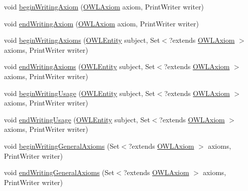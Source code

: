 \begin{DoxyCompactItemize}
\item 
void \hyperlink{classuk_1_1ac_1_1manchester_1_1cs_1_1owlapi_1_1dlsyntax_1_1_d_l_syntax_ontology_storer_base_ae46e9c3d6b3b31254873389ff08f0734}{begin\-Writing\-Axiom} (\hyperlink{interfaceorg_1_1semanticweb_1_1owlapi_1_1model_1_1_o_w_l_axiom}{O\-W\-L\-Axiom} axiom, Print\-Writer writer)
\item 
void \hyperlink{classuk_1_1ac_1_1manchester_1_1cs_1_1owlapi_1_1dlsyntax_1_1_d_l_syntax_ontology_storer_base_abe39b14e66986c88027bdbce7e67cc7f}{end\-Writing\-Axiom} (\hyperlink{interfaceorg_1_1semanticweb_1_1owlapi_1_1model_1_1_o_w_l_axiom}{O\-W\-L\-Axiom} axiom, Print\-Writer writer)
\item 
void \hyperlink{classuk_1_1ac_1_1manchester_1_1cs_1_1owlapi_1_1dlsyntax_1_1_d_l_syntax_ontology_storer_base_af89491b447926bdeca0884fe5862254d}{begin\-Writing\-Axioms} (\hyperlink{interfaceorg_1_1semanticweb_1_1owlapi_1_1model_1_1_o_w_l_entity}{O\-W\-L\-Entity} subject, Set$<$?extends \hyperlink{interfaceorg_1_1semanticweb_1_1owlapi_1_1model_1_1_o_w_l_axiom}{O\-W\-L\-Axiom} $>$ axioms, Print\-Writer writer)
\item 
void \hyperlink{classuk_1_1ac_1_1manchester_1_1cs_1_1owlapi_1_1dlsyntax_1_1_d_l_syntax_ontology_storer_base_a3b9898b68a15e9188c1e359b1861134a}{end\-Writing\-Axioms} (\hyperlink{interfaceorg_1_1semanticweb_1_1owlapi_1_1model_1_1_o_w_l_entity}{O\-W\-L\-Entity} subject, Set$<$?extends \hyperlink{interfaceorg_1_1semanticweb_1_1owlapi_1_1model_1_1_o_w_l_axiom}{O\-W\-L\-Axiom} $>$ axioms, Print\-Writer writer)
\item 
void \hyperlink{classuk_1_1ac_1_1manchester_1_1cs_1_1owlapi_1_1dlsyntax_1_1_d_l_syntax_ontology_storer_base_aaddb37590b2ea392d5ace07a086b1e8d}{begin\-Writing\-Usage} (\hyperlink{interfaceorg_1_1semanticweb_1_1owlapi_1_1model_1_1_o_w_l_entity}{O\-W\-L\-Entity} subject, Set$<$?extends \hyperlink{interfaceorg_1_1semanticweb_1_1owlapi_1_1model_1_1_o_w_l_axiom}{O\-W\-L\-Axiom} $>$ axioms, Print\-Writer writer)
\item 
void \hyperlink{classuk_1_1ac_1_1manchester_1_1cs_1_1owlapi_1_1dlsyntax_1_1_d_l_syntax_ontology_storer_base_a0bfdc978a43d228f52cd10b4ef5d93ae}{end\-Writing\-Usage} (\hyperlink{interfaceorg_1_1semanticweb_1_1owlapi_1_1model_1_1_o_w_l_entity}{O\-W\-L\-Entity} subject, Set$<$?extends \hyperlink{interfaceorg_1_1semanticweb_1_1owlapi_1_1model_1_1_o_w_l_axiom}{O\-W\-L\-Axiom} $>$ axioms, Print\-Writer writer)
\item 
void \hyperlink{classuk_1_1ac_1_1manchester_1_1cs_1_1owlapi_1_1dlsyntax_1_1_d_l_syntax_ontology_storer_base_a844fc16f408e02d3445f662c9bac9569}{begin\-Writing\-General\-Axioms} (Set$<$?extends \hyperlink{interfaceorg_1_1semanticweb_1_1owlapi_1_1model_1_1_o_w_l_axiom}{O\-W\-L\-Axiom} $>$ axioms, Print\-Writer writer)
\item 
void \hyperlink{classuk_1_1ac_1_1manchester_1_1cs_1_1owlapi_1_1dlsyntax_1_1_d_l_syntax_ontology_storer_base_a303a63a52b59e5b928f35bb5085393dd}{end\-Writing\-General\-Axioms} (Set$<$?extends \hyperlink{interfaceorg_1_1semanticweb_1_1owlapi_1_1model_1_1_o_w_l_axiom}{O\-W\-L\-Axiom} $>$ axioms, Print\-Writer writer)
\end{DoxyCompactItemize}
